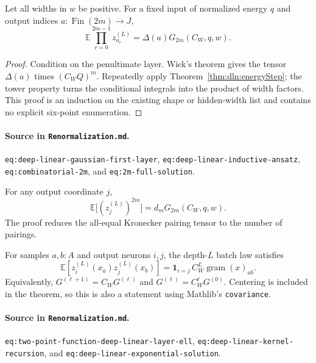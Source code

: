 \begin{theorem}
\label{thm:dln:evenMoments}
Let all widths in $w$ be positive.  For a fixed input of normalized energy $q$ and output indices
$a:\operatorname{Fin}(2m)\to J$,
\[
 \mathbb E\prod_{r=0}^{2m-1}z_{a_r}^{(L)}
   =\Delta(a)G_{2m}(C_W,q,w).
\]

\begin{proof}
Condition on the penultimate layer.  Wick's theorem gives the tensor $\Delta(a)$ times
$(C_WQ)^m$.  Repeatedly apply Theorem~\ref{thm:dln:energyStep}; the tower property turns the
conditional integrals into the product of width factors.  This proof is an induction on the
existing shape or hidden-width list and contains no explicit six-point enumeration.
\end{proof}

\paragraph{Source in \texttt{Renormalization.md}.}
\texttt{eq:deep-linear-gaussian-first-layer},
\texttt{eq:deep-linear-inductive-ansatz},
\texttt{eq:combinatorial-2m}, and \texttt{eq:2m-full-solution}.
\end{theorem}

\begin{corollary}
\label{cor:dln:scalarMoment}
For any output coordinate $j$,
\[
 \mathbb E\big[(z_j^{(L)})^{2m}\big]=d_mG_{2m}(C_W,q,w).
\]
The proof reduces the all-equal Kronecker pairing tensor to the number of pairings.
\end{corollary}

\begin{theorem}
\label{thm:dln:covarianceRecursion}
For samples $a,b:A$ and output neurons $i,j$, the depth-$L$ batch law satisfies
\[
 \mathbb E[z_i^{(L)}(x_a)z_j^{(L)}(x_b)]
 =\mathbf 1_{i=j}\,C_W^L\operatorname{gram}(x)_{ab}.
\]
Equivalently, $G^{(\ell+1)}=C_WG^{(\ell)}$ and
$G^{(\ell)}=C_W^\ell G^{(0)}$.  Centering is included in the theorem, so this is also a statement
using Mathlib's \texttt{covariance}.

\paragraph{Source in \texttt{Renormalization.md}.}
\texttt{eq:two-point-function-deep-linear-layer-ell},
\texttt{eq:deep-linear-kernel-recursion}, and
\texttt{eq:deep-linear-exponential-solution}.
\end{theorem}

